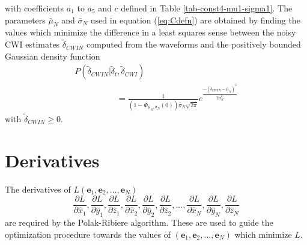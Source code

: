 \documentclass[extra, onecolumn, doublespacing]{gji}
\begin{document}
with coefficients $a_1$ to $a_5$ and $c$ defined in Table
\ref{tab-const4-mu1-sigma1}. The parameters $\bar{\mu}_N$ and
$\bar{\sigma}_N$ used in equation (\ref{eq:Cdefn}) are obtained by
finding the values which minimize the difference in a least squares
sense between the noisy CWI estimates $\widetilde{\delta}_{CWIN}$
computed from the waveforms and the positively bounded Gaussian
density function
\begin{equation}
\label{eq-likelihood-noisydata-pdf-orig}
\begin{array}{l}
P(\widetilde{\delta}_{CWIN}|\widetilde{\delta}_t,\widetilde{\delta}_{CWI}) \\
\hspace{5em} = \frac{1}{\left(1-\Phi_{\bar{\mu}_N,\bar{\sigma}_N}(0)\right)\bar{\sigma}_N\sqrt{2\pi}}
e^{  \frac{-(\widetilde{\delta}_{CWIN}-\bar{\mu}_N)^2}{2\bar{\sigma}_N^2}  }
\end{array}
\end{equation}
with $\widetilde{\delta}_{CWIN} \geq 0$.

\section{Derivatives}
\label{sec-Appendix-derivatives_ofL}

The derivatives of $L(\mathbf{e}_1,\mathbf{e}_2,...,\mathbf{e}_N)$
\begin{equation}
\frac{\partial L}{\partial \hat{x}_1},
\frac{\partial L}{\partial \hat{y}_1},
 \frac{\partial L}{\partial \hat{z}_1},
\frac{\partial L}{\partial \hat{x}_2},
\frac{\partial L}{\partial \hat{y}_2},
\frac{\partial L}{\partial \hat{z}_2},
...,
\frac{\partial L}{\partial \hat{x}_N},
\frac{\partial L}{\partial \hat{y}_N},
\frac{\partial L}{\partial \hat{z}_N}
\end{equation}
are required by the Polak-Ribiere algorithm. These are used to guide
the optimization procedure towards the values of
$(\mathbf{e}_1,\mathbf{e}_2,...,\mathbf{e}_N)$ which minimize $L$.
\end{document}
